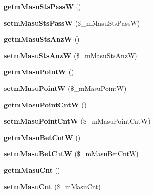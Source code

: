 \begin{DoxyCompactItemize}
{\bfseries getm\+Masu\+Sts\+PassW} ()
\item 
\mbox{\label{class_reversi_a76f39ccd1a55c6202985c310af21448d}} 
{\bfseries setm\+Masu\+Sts\+PassW} (\$\+\_\+m\+Masu\+Sts\+PassW)
\item 
\mbox{\label{class_reversi_a2e6dc6afd4e1f554a3a314e2638dc5aa}} 
{\bfseries getm\+Masu\+Sts\+AnzW} ()
\item 
\mbox{\label{class_reversi_a2fa42edd87104a0048ca0efecbb59708}} 
{\bfseries setm\+Masu\+Sts\+AnzW} (\$\+\_\+m\+Masu\+Sts\+AnzW)
\item 
\mbox{\label{class_reversi_ad8037037ea6c12c5f72bb1d1b5802d98}} 
{\bfseries getm\+Masu\+PointW} ()
\item 
\mbox{\label{class_reversi_a216f8ea81ed1a4d567bcbb9efe03b358}} 
{\bfseries setm\+Masu\+PointW} (\$\+\_\+m\+Masu\+PointW)
\item 
\mbox{\label{class_reversi_aa34fdde67253d92780a746ab64371956}} 
{\bfseries getm\+Masu\+Point\+CntW} ()
\item 
\mbox{\label{class_reversi_ab0ec543b38c99910b3f4b254c757b9b3}} 
{\bfseries setm\+Masu\+Point\+CntW} (\$\+\_\+m\+Masu\+Point\+CntW)
\item 
\mbox{\label{class_reversi_a513ff1271786bb02da384150ee891453}} 
{\bfseries getm\+Masu\+Bet\+CntW} ()
\item 
\mbox{\label{class_reversi_ae2b4be273c04556474b686db886cc97b}} 
{\bfseries setm\+Masu\+Bet\+CntW} (\$\+\_\+m\+Masu\+Bet\+CntW)
\item 
\mbox{\label{class_reversi_a32cebf699f9aa19d9053c143c3562d3a}} 
{\bfseries getm\+Masu\+Cnt} ()
\item 
\mbox{\label{class_reversi_ad50e5fa90e6a2f53bf71ed04bed603ae}} 
{\bfseries setm\+Masu\+Cnt} (\$\+\_\+m\+Masu\+Cnt)
\item 
\mbox{\label{class_reversi_a3ac7b23d1b6567faa4d58d51a952c859}} 

\end{DoxyCompactItemize}
